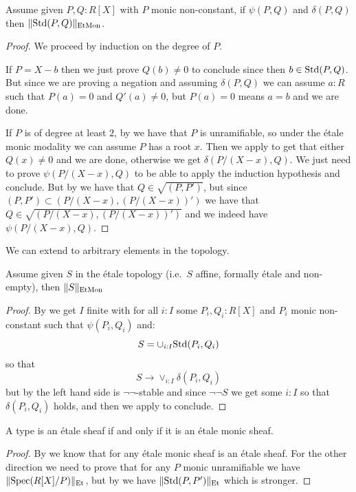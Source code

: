 \begin{lemma}\label{standard-etale-are-etale-monic}
Assume given $P,Q:R[X]$ with $P$ monic non-constant, if $\psi(P,Q)$ and $\delta(P,Q)$ then $\lVert \mathrm{Std}(P,Q) \rVert_{\mathrm{EtMon}}$.
\end{lemma}

\begin{proof}
We proceed by induction on the degree of $P$. 

If $P = X-b$ then we just prove $Q(b)\not=0$ to conclude since then $b\in\mathrm{Std}(P,Q)$. But since we are proving a negation and assuming $\delta(P,Q)$ we can assume $a:R$ such that $P(a)=0$ and $Q'(a)\not=0$, but $P(a)=0$ means $a=b$ and we are done.

If $P$ is of degree at least $2$, by  we have that $P$ is unramifiable, so under the \'etale monic modality we can assume $P$ has a root $x$. Then we apply  to get that either $Q(x)\not=0$ and we are done, otherwise we get $\delta(P/(X-x),Q)$. We just need to prove $\psi(P/(X-x),Q)$ to be able to apply the induction hypothesis and conclude. But by  we have that $Q\in\sqrt{(P,P')}$, but since $(P,P')\subset (P/(X-x),(P/(X-x))')$ we have that $Q\in \sqrt{(P/(X-x),(P/(X-x))')}$ and we indeed have $\psi(P/(X-x),Q)$.
\end{proof}

We can extend to arbitrary elements in the topology.

\begin{lemma}\label{etale-monic-contractibility}
Assume given $S$ in the \'etale topology (i.e.\ $S$ affine, formally \'etale and non-empty), then $\lVert S \rVert_{\mathrm{EtMon}}$
\end{lemma}

\begin{proof}
By  we get $I$ finite with for all $i:I$ some $P_i,Q_i:R[X]$ and $P_i$ monic non-constant such that $\psi(P_i,Q_i)$ and:
\[S = \cup_{i:I}\mathrm{Std}(P_i,Q_i)\]
so that
\[S \to \lor_{i:I}\delta(P_i,Q_i)\]
but by  the left hand side is $\neg\neg$-stable and since $\neg\neg S$ we get some $i:I$ so that $\delta(P_i,Q_i)$ holds, and then we apply  to conclude.
\end{proof}

\begin{theorem}\label{etale-characterisation-monic}
A type is an \'etale sheaf if and only if it is an \'etale monic sheaf.
\end{theorem}

\begin{proof}
By  we know that for any \'etale monic sheaf is an \'etale sheaf. For the other direction we need to prove that for any $P$ monic unramifiable we have $\lVert \operatorname{Spec}(R[X]/P) \rVert_{\mathrm{Et}}$, but by  we have $\lVert \mathrm{Std}(P,P') \rVert_{\mathrm{Et}}$ which is stronger. 
\end{proof}

